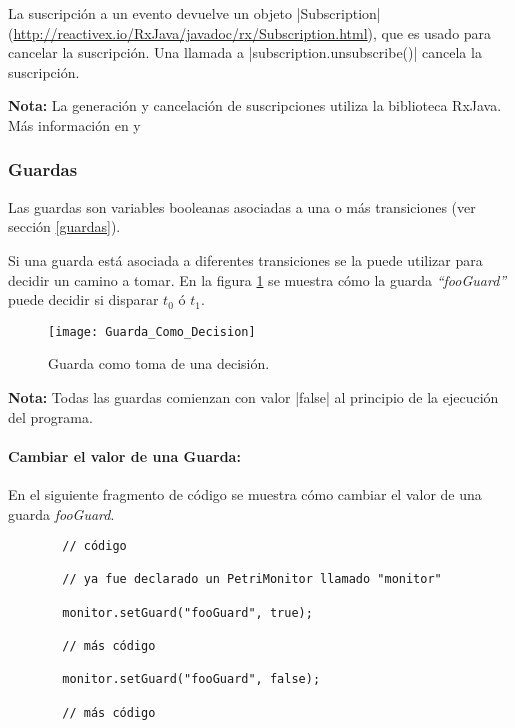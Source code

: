 La suscripción a un evento devuelve un objeto |Subscription|
(\url{http://reactivex.io/RxJava/javadoc/rx/Subscription.html}),
que es usado para cancelar la suscripción.
Una llamada a |subscription.unsubscribe()| cancela la suscripción.

\begin{framed}
\textbf{Nota:} La generación y cancelación de suscripciones utiliza la
biblioteca RxJava. Más información en \cite{RxJava} y \cite{RxJavaJavadoc}
\end{framed}

\subsubsection{Guardas}

Las guardas son variables booleanas asociadas a una o más transiciones (ver
sección \ref{guardas}).

Si una guarda está asociada a diferentes transiciones se la puede utilizar para
decidir un camino a tomar. En la figura \ref{fig:guarda_como_decision} se
muestra cómo la guarda \textit{``fooGuard''} puede decidir si disparar $t_{0}$ ó
$t_{1}$.

\begin{figure}[H]
  \centering
  \texttt{[image: Guarda\_Como\_Decision]}
  \caption{Guarda como toma de una decisión.}
  \label{fig:guarda_como_decision}
\end{figure}

\begin{framed}
\textbf{Nota:} Todas las guardas comienzan con valor |false| al
principio de la ejecución del programa.
\end{framed}

\paragraph{Cambiar el valor de una Guarda:} En el siguiente fragmento de código
se muestra cómo cambiar el valor de una guarda \textit{fooGuard}.

\begin{figure}[H]
\centering
\begin{verbatim}
  // código
  
  // ya fue declarado un PetriMonitor llamado "monitor"
  
  monitor.setGuard("fooGuard", true);
  
  // más código
  
  monitor.setGuard("fooGuard", false);
  
  // más código
\end{verbatim}
\end{figure}


